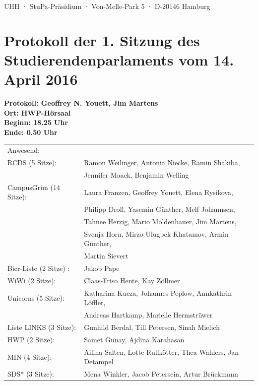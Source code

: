 \documentclass[ngerman,headheight=70pt]{scrartcl}
\begin{document}
    UHH · StuPa-Präsidium · Von-Melle-Park 5 · D-20146 Hamburg

    \section*{Protokoll der 1. Sitzung des Studierendenparlaments vom 14. April 2016}

    \textbf{Protokoll: Geoffrey N. Youett, Jim Martens}\\
    \textbf{Ort: HWP-Hörsaal}\\
    \textbf{Beginn: 18.25 Uhr}\\
    \textbf{Ende: 0.50 Uhr}

    \vspace{0.5cm}
    \begin{tabular}{ll}
        Anwesend: & \\
            RCDS (5 Sitze): & Ramon Weilinger, Antonia Niecke, Ramin Shakiba, \\
                            & Jennifer Maack, Benjamin Welling \\
             CampusGrün (14 Sitze): & Laura Franzen, Geoffrey Youett, Elena Rysikova, \\
                                   & Philipp Droll, Yasemin Günther, Melf Johannsen,\\
                                   & Tahnee Herzig, Mario Moldenhauer, Jim Martens,\\
                                   & Svenja Horn, Mirzo Ulugbek Khatamov, Armin Günther,\\
                                   & Martin Sievert \\
             Bier-Liste (2 Sitze) : & Jakob Pape \\
             WiWi (2 Sitze): & Claas-Friso Hente, Kay Zöllmer \\
             Unicorns (5 Sitze): & Katharina Kucza, Johannes Peplow, Annkathrin Löffler, \\
                                 & Andreas Hartkamp, Marielle Hermstrüwer \\
             Liste LINKS (3 Sitze): & Gunhild Berdal, Till Petersen, Sinah Mielich \\
             HWP (2 Sitze): & Samet Gunay, Ajdina Karahasan \\
             MIN (4 Sitze): & Ailina Salten, Lotte Rullkötter, Thea Wahlers, Jan Detampel \\
             SDS* (3 Sitze): & Mena Winkler, Jacob Petersein, Artur Brückmann \\

\end{tabular}
\end{document}
